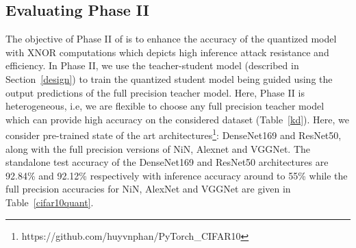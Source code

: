 

\subsection{Evaluating Phase II}
\label{evalPh2}

The objective of Phase II of \method\hspace{0.02in} is to enhance the accuracy of the quantized model with XNOR computations which depicts high inference attack resistance and efficiency.
In Phase II, we use the teacher-student model (described in Section~\ref{design}) to train the quantized student model being guided using the output predictions of the full precision teacher model.
Here, Phase II is heterogeneous, i.e, we are flexible to choose any full precision teacher model which can provide high accuracy on the considered dataset (Table~\ref{kd}).
Here, we consider pre-trained state of the art architectures\footnote{https://github.com/huyvnphan/PyTorch\_CIFAR10}: DenseNet169 and ResNet50, along with the full precision versions of NiN, Alexnet and VGGNet.
The standalone test accuracy of the DenseNet169 and ResNet50 architectures are 92.84\% and 92.12\% respectively with inference accuracy around to 55\% while the full precision accuracies for NiN, AlexNet and VGGNet are given in Table~\ref{cifar10quant}.


